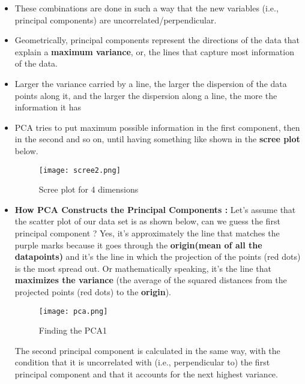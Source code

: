 \documentclass[a4paper, 11pt]{article}
\begin{document}
\begin{itemize}
\begin{itemize}
        \item These combinations are done in such a way that the new variables (i.e., principal components) are uncorrelated/perpendicular.
        \item Geometrically, principal components represent the directions of the data that explain a \textbf{maximum variance}, or, the lines that capture most information of the data.
        \item Larger the variance carried by a line, the larger the dispersion of the data points along it, and the larger the dispersion along a line, the more the information it has
        \item PCA tries to put maximum possible information in the first component, then in the second and so on, until having something like shown in the \textbf{scree plot} below.
\begin{figure}[h!]
    \centering
    \texttt{[image: scree2.png]}
    \caption{Scree plot for 4 dimensions}
    \label{fig:fig1}
  \end{figure}
  \item \textbf{How PCA Constructs the Principal Components : }Let’s assume that the scatter plot of our data set is as shown below, 
  can we guess the first principal component ? Yes, it’s approximately the line 
  that matches the purple marks because it goes through the \textbf{origin(mean of all the datapoints)} and it’s the line in which the projection of the points (red dots) is the most spread out. 
  Or mathematically speaking, it’s the line that \textbf{maximizes the variance} (the average of the squared distances from the projected points (red dots) to the \textbf{origin}).
  \begin{figure}[h!]
    \texttt{[image: pca.png]}
    \caption{Finding the PCA1}
    \label{fig:fig2}
  \end{figure}
  The second principal component is calculated in the same way, with the condition that it is uncorrelated with (i.e., perpendicular to) the first principal component and that it accounts for the next highest variance.
    \end{itemize}  
\end{itemize}
\end{document}
